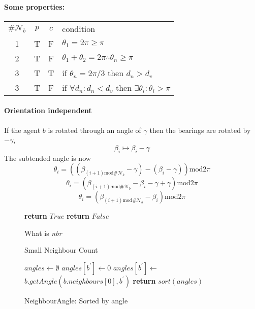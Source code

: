 \documentclass{ieeeaccess}
\begin{document}
\paragraph{Some properties:}
\begin{tabularx}{\columnwidth}{cccX}
	$\#\mathcal{N}_b$ & $p$ & $c$ & condition \\
	1 & T & F & $\theta_1=2\pi\geq\pi$ \\
	2 & T & F & $\theta_1+\theta_2=2\pi \therefore \theta_n\geq\pi$ \\
	3 & T & T & if $\theta_n=2\pi/3$ then $d_n>d_v$ \\
	3 & T & F & if $\forall d_n: d_n<d_v$ then $\exists\theta_i:\theta_i>\pi$
\end{tabularx}

\paragraph{Orientation independent}  If the agent $b$ is rotated through an angle of $\gamma$ then 
the bearings are rotated by $-\gamma$, \[ \beta_i\mapsto\beta_i-\gamma \]
The subtended angle is now
\[
	\theta_i  =  ( (\beta_{(i+1)\mathrm{mod}\#\mathcal{N}_b}-\gamma) - (\beta_i-\gamma))\mathrm{mod}2\pi 
\]
\[
	\theta_i = (\beta_{(i+1)\mathrm{mod}\#\mathcal{N}_b}-\beta_i-\gamma+\gamma)\mathrm{mod}2\pi
\]
\[
	\theta_i = (\beta_{(i+1)\mathrm{mod}\#\mathcal{N}_b}-\beta_i )\mathrm{mod}2\pi
\]
\clearpage
\begin{figure}
\begin{algorithmic}[1]
{}
   \State\textbf{return} $True$
\EndIf
\State\textbf{return} $False$
\EndProcedure
\end{algorithmic}
\caption{Small Neighbour Count}
\label{algo:SmallNeighbourCount}
What is \textit{nbr}
\end{figure}

\begin{figure}
\begin{algorithmic}[1]
{}
\State $angles \gets \emptyset$
  \State $angles[b^{'}] \gets 0$
\Else
   \State $angles[b^{'}] \gets $ \hfill
  \Statex \hfill $b.getAngle(b.neighbours[0], b^{'})$ 
\EndIf
\EndFor
\State\textbf{return} $sort(angles)$ 
\EndProcedure
\end{algorithmic}
\caption{NeighbourAngle: Sorted by angle}
\label{algo:getNeighbourAngles}

\end{figure}
\end{document}
